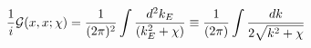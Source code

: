 \begin{equation}
\frac{1}{i} {\cal G}(x,x;\chi)=\frac{1} {(2 \pi)^2} \int \frac {d^2
k_E}{(k_E^2 +\chi)} \equiv \frac{1}
{(2
\pi)} \int
\frac {d k}{2 \sqrt{k^2 +\chi}}
\end{equation}

